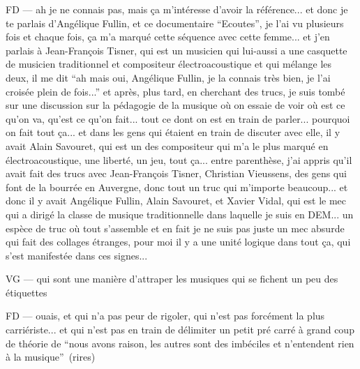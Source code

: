 FD — ah je ne connais pas, mais ça m'intéresse d'avoir la référence... et donc je te parlais d'Angélique Fullin, et ce documentaire ``Ecoutes'', je l'ai vu plusieurs fois et chaque fois, ça m'a marqué cette séquence avec cette femme... et j'en parlais à Jean-François Tisner, qui est un musicien qui lui-aussi a une casquette de musicien traditionnel et compositeur électroacoustique et qui mélange les deux, il me dit ``ah mais oui, Angélique Fullin, je la connais très bien, je l'ai croisée plein de fois...''  et après, plus tard, en cherchant des trucs, je suis tombé sur une discussion sur la pédagogie de la musique où on essaie de voir où est ce qu'on va, qu'est ce qu'on fait... tout ce dont on est en train de parler... pourquoi on fait tout ça... et dans les gens qui étaient en train de discuter avec elle, il y avait Alain Savouret, qui est un des compositeur qui m'a le plus marqué en électroacoustique, une liberté, un jeu, tout ça... entre parenthèse, j'ai appris qu'il avait fait des trucs avec Jean-François Tisner, Christian Vieussens, des gens qui font de la bourrée en Auvergne, donc tout un truc qui m'importe beaucoup... et donc il y avait Angélique Fullin, Alain Savouret, et Xavier Vidal, qui est le mec qui a dirigé la classe de musique traditionnelle dans laquelle je suis en DEM... un espèce de truc où tout s'assemble et en fait je ne suis pas juste un mec absurde qui fait des collages étranges, pour moi il y a une unité logique dans tout ça, qui s'est manifestée dans ces signes... 

VG — qui sont une manière d'attraper les musiques qui se fichent un peu des étiquettes 

FD — ouais, et qui n'a pas peur de rigoler, qui n'est pas forcément la plus carriériste... et qui n'est pas en train de délimiter un petit pré carré à grand coup de théorie de ``nous avons raison, les autres sont des imbéciles et n'entendent rien à la musique'' (rires) 
